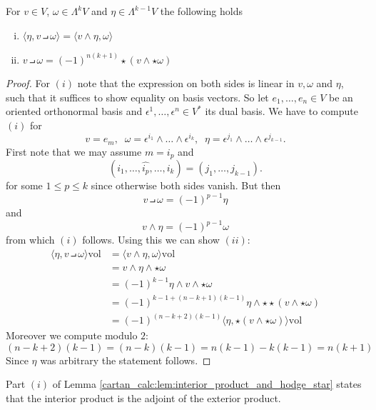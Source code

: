 \begin{lemma}
    \label{cartan_calc:lem:interior_product_and_hodge_star}
    For $v\in V$, $\omega \in \Lambda^k V$ and $\eta \in \Lambda^{k-1}V$ the following holds 
    \begin{enumerate}[(i)]
        \item $\langle \eta, v \intprod \omega \rangle = \langle v \wedge\eta, \omega \rangle$
        \item $v \intprod \omega = (-1)^{n(k+1)} \star (v \wedge \star \omega)$
    \end{enumerate}
\end{lemma}

\begin{proof}
    For $(i)$ note that the expression on both sides is linear in $v, \omega$ and $\eta$, such that it suffices to show equality on basis vectors. So let $e_1,\ldots,e_n \in V$ be an oriented orthonormal basis and $\epsilon^1,\ldots,\epsilon^n \in V^\ast$ its dual basis. We have to compute $(i)$ for
    \[
    v = e_m, \;\; \omega = \epsilon^{i_1} \wedge \ldots \wedge \epsilon^{i_k}, \;\; \eta = \epsilon^{j_1} \wedge \ldots \wedge \epsilon^{j_{k-1}}.
    \]
    First note that we may assume $m = i_p$ and
    \[
    (i_1,\ldots,\widehat{i_p},\ldots,i_k) = (j_1,\ldots,j_{k-1}).
    \] 
    for some $1 \leq p \leq k$ since otherwise both sides vanish. But then
    \[
    v \intprod \omega = (-1)^{p-1} \eta
    \]
    and 
    \[
    v \wedge \eta = (-1)^{p-1} \omega
    \]
    from which $(i)$ follows. Using this we can show $(ii)$:
    \begin{align*}
        \langle \eta , v \intprod \omega \rangle \mathrm{vol} & = \langle v \wedge \eta, \omega \rangle \mathrm{vol}\\
        &= v \wedge \eta \wedge \star \omega \\
        &= (-1)^{k-1} \eta \wedge v \wedge \star \omega \\
        &= (-1)^{k-1 + (n-k+1)(k-1)} \eta \wedge \star\star(v \wedge \star \omega) \\
        &= (-1)^{(n-k+2)(k-1)} \langle \eta, \star (v \wedge \star \omega)\rangle \mathrm{vol}
    \end{align*}
    Moreover we compute modulo $2$:
    \[
        (n-k + 2) (k-1) = (n-k)(k-1) = n(k-1) - k(k-1) = n(k+1)
    \]
    Since $\eta$ was arbitrary the statement follows.
\end{proof}

\begin{remark}
    Part $(i)$ of Lemma \ref{cartan_calc:lem:interior_product_and_hodge_star} states that the interior product is the adjoint of the exterior product.
\end{remark}

